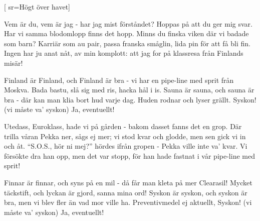 

[
sr={Högt över havet}]

\beginverse*
Vem är du, vem är jag -
har jag mist förståndet?
Hoppas på att du ger mig svar.
Har vi samma blodomlopp
finns det hopp.
Minns du finska viken där vi badade som barn?
Karriär som au pair, 
passa franska småglin,
lida pin för att få bli fin.
Ingen har ju anat nåt,
av min komplott:
att jag for på klassresa från Finlands misär!
\endverse

\beginchorus
Finland är Finland, och Finland är bra - 
vi har en pipe-line med sprit från Moskva.
Bada bastu, slå sig med ris,
hacka hål i is.
Sauna är sauna, och sauna är bra -
där kan man klia bort hud varje dag.
Huden rodnar och lyser grällt.
Syskon! (vi måste va' syskon)
Ja, eventuellt!
\endchorus

\newpage
\beginverse*
Utedass, Euroklass,
hade vi på gården - 
bakom dasset fanns det en grop.
Där trilla våran Pekka ner,
sågs ej mer;
vi stod kvar och glodde, men sen gick vi in och åt.
``S.O.S., hör ni mej?'' hördes ifrån gropen -
Pekka ville inte va' kvar.
Vi försökte dra han opp,
men det var stopp,
för han hade fastnat i vår pipe-line med sprit!
\endverse

\beginchorus
Finnar är finnar, och syns på en mil -
då får man kleta på mer Clearasil!
Mycket täckstift, och lyckan är gjord,
sanna mina ord!
Syskon är syskon, och syskon är bra,
men vi blev fler än vad mor ville ha.
Preventivmedel ej aktuellt,
Syskon! (vi måste va' syskon)
Ja, eventuellt!
\endchorus
\endsong


